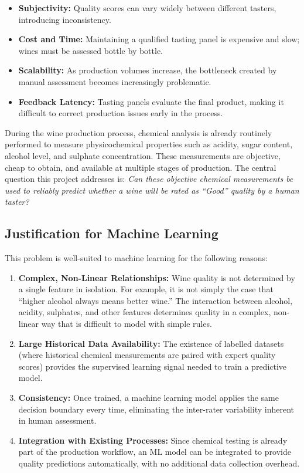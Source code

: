 \documentclass[11pt,a4paper]{article}
\begin{document}
\begin{itemize}
    \item \textbf{Subjectivity:} Quality scores can vary widely between different tasters, introducing inconsistency.
    \item \textbf{Cost and Time:} Maintaining a qualified tasting panel is expensive and slow; wines must be assessed bottle by bottle.
    \item \textbf{Scalability:} As production volumes increase, the bottleneck created by manual assessment becomes increasingly problematic.
    \item \textbf{Feedback Latency:} Tasting panels evaluate the final product, making it difficult to correct production issues early in the process.
\end{itemize}

During the wine production process, chemical analysis is already routinely performed to measure physicochemical properties such as acidity, sugar content, alcohol level, and sulphate concentration. These measurements are objective, cheap to obtain, and available at multiple stages of production. The central question this project addresses is: \textit{Can these objective chemical measurements be used to reliably predict whether a wine will be rated as ``Good'' quality by a human taster?}

\subsection{Justification for Machine Learning}

This problem is well-suited to machine learning for the following reasons:

\begin{enumerate}
    \item \textbf{Complex, Non-Linear Relationships:} Wine quality is not determined by a single feature in isolation. For example, it is not simply the case that ``higher alcohol always means better wine.'' The interaction between alcohol, acidity, sulphates, and other features determines quality in a complex, non-linear way that is difficult to model with simple rules.

    \item \textbf{Large Historical Data Availability:} The existence of labelled datasets (where historical chemical measurements are paired with expert quality scores) provides the supervised learning signal needed to train a predictive model.

    \item \textbf{Consistency:} Once trained, a machine learning model applies the same decision boundary every time, eliminating the inter-rater variability inherent in human assessment.

    \item \textbf{Integration with Existing Processes:} Since chemical testing is already part of the production workflow, an ML model can be integrated to provide quality predictions automatically, with no additional data collection overhead.
\end{enumerate}
\end{document}
